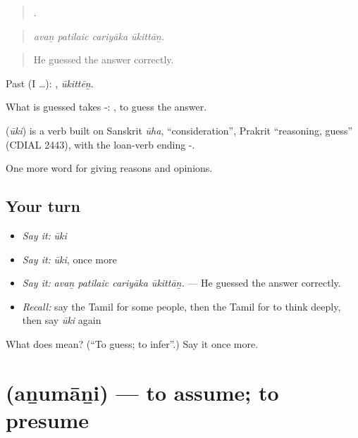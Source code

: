 \begin{quote}
   .
\end{quote}

\begin{quote}
\emph{avaṉ patilaic cariyāka ūkittāṉ.}
\end{quote}

\begin{quote}
He guessed the answer correctly.
\end{quote}

Past (I …): , \emph{ūkittēṉ}.

What is guessed takes -:  , to guess the answer.

\begin{cousinweb}
\textbf{} (\emph{ūki}) is a verb built on Sanskrit \emph{ūha}, \textquotedblleft{}consideration\textquotedblright{}, Prakrit \textquotedblleft{}reasoning, guess\textquotedblright{} (CDIAL 2443), with the loan-verb ending -.
\end{cousinweb}

\begin{grammarlens}[title={What you've built}]
One more word for giving reasons and opinions.
\end{grammarlens}

\subsection*{Your turn}
\begin{itemize}
\raggedright
  \item \emph{Say it:} \emph{ūki}
  \item \emph{Say it:} \emph{ūki}, once more
  \item \emph{Say it:} \emph{avaṉ patilaic cariyāka ūkittāṉ.} — He guessed the answer correctly.
  \item \emph{Recall:} say the Tamil for some people, then the Tamil for to think deeply, then say \emph{ūki} again
\end{itemize}

\begin{tcolorbox}[breakable,colback=teal!4,colframe=teal!35!black,title={Before you move on}]
What does  mean? (\textquotedblleft{}To guess; to infer\textquotedblright{}.) Say it once more.
\end{tcolorbox}
\section[\texorpdfstring{\ta{அனுமானி} (aṉumāṉi)}{அனுமானி (aṉumāṉi)}]{ (aṉumāṉi) — to assume; to presume}

